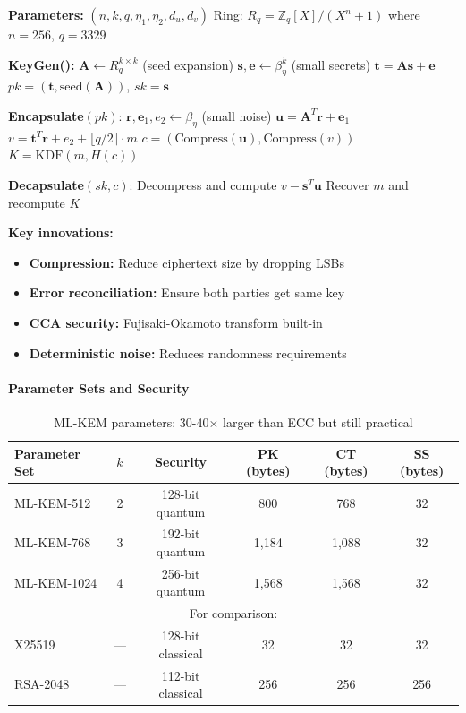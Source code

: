 \documentclass[11pt,a4paper]{article}
\begin{document}
\begin{algorithm}
\caption{ML-KEM (Kyber) Overview}
\label{alg:kyber}
\begin{algorithmic}[1]
\State \textbf{Parameters:} $(n, k, q, \eta_1, \eta_2, d_u, d_v)$
\State Ring: $R_q = \mathbb{Z}_q[X]/(X^n + 1)$ where $n = 256$, $q = 3329$

\State \textbf{KeyGen():}
\State \quad $\mathbf{A} \leftarrow R_q^{k \times k}$ (seed expansion)
\State \quad $\mathbf{s}, \mathbf{e} \leftarrow \beta_\eta^{k}$ (small secrets)
\State \quad $\mathbf{t} = \mathbf{A}\mathbf{s} + \mathbf{e}$
\State \quad $pk = (\mathbf{t}, \text{seed}(\mathbf{A}))$, $sk = \mathbf{s}$

\State \textbf{Encapsulate}$(pk)$:
\State \quad $\mathbf{r}, \mathbf{e}_1, e_2 \leftarrow \beta_\eta$ (small noise)
\State \quad $\mathbf{u} = \mathbf{A}^T\mathbf{r} + \mathbf{e}_1$
\State \quad $v = \mathbf{t}^T\mathbf{r} + e_2 + \lfloor q/2 \rceil \cdot m$
\State \quad $c = (\text{Compress}(\mathbf{u}), \text{Compress}(v))$
\State \quad $K = \text{KDF}(m, H(c))$

\State \textbf{Decapsulate}$(sk, c)$:
\State \quad Decompress and compute $v - \mathbf{s}^T\mathbf{u}$
\State \quad Recover $m$ and recompute $K$
\end{algorithmic}
\end{algorithm}

\textbf{Key innovations:}
\begin{itemize}
    \item \textbf{Compression:} Reduce ciphertext size by dropping LSBs
    \item \textbf{Error reconciliation:} Ensure both parties get same key
    \item \textbf{CCA security:} Fujisaki-Okamoto transform built-in
    \item \textbf{Deterministic noise:} Reduces randomness requirements
\end{itemize}

\paragraph{Parameter Sets and Security}

\begin{table}[h]
\centering
\begin{tabular}{|l|c|c|c|c|c|}
\hline
\textbf{Parameter Set} & \textbf{$k$} & \textbf{Security} & \textbf{PK (bytes)} & \textbf{CT (bytes)} & \textbf{SS (bytes)} \\
\hline
ML-KEM-512 & 2 & 128-bit quantum & 800 & 768 & 32 \\
ML-KEM-768 & 3 & 192-bit quantum & 1,184 & 1,088 & 32 \\
ML-KEM-1024 & 4 & 256-bit quantum & 1,568 & 1,568 & 32 \\
\hline
\multicolumn{6}{c}{For comparison:} \\
\hline
X25519 & — & 128-bit classical & 32 & 32 & 32 \\
RSA-2048 & — & 112-bit classical & 256 & 256 & 256 \\
\hline
\end{tabular}
\caption{ML-KEM parameters: 30-40× larger than ECC but still practical}
\end{table}
\end{document}
